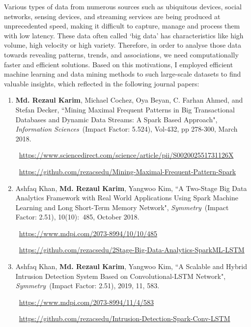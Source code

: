 \begin{appendices}
\hspace*{5mm} Various types of data from numerous sources such as ubiquitous devices, social networks, sensing devices, and streaming services are being produced at unprecedented speed, making it difficult to capture, manage and process them with low latency. These data often called `big data' has characteristics like high volume, high velocity or high variety. Therefore, in order to analyse those data towards revealing patterns, trends, and associations, we need computationally faster and efficient solutions. Based on this motivations, I employed efficient machine learning and data mining methods to such large-scale datasets to find valuable insights, which reflected in the following journal papers:

\begin{enumerate}[noitemsep]
	\item {\bf Md. Rezaul Karim}, Michael Cochez, Oya Beyan, C. Farhan Ahmed, and Stefan Decker, ``Mining Maximal Frequent Patterns in Big Transactional Databases and Dynamic Data Streams: A Spark Based Approach", \emph{Information Sciences}~(Impact Factor: 5.524), Vol-432, pp 278-300, March 2018.
	
	\faLink~\url{https://www.sciencedirect.com/science/article/pii/S002002551731126X}
	
	\faGithub~\url{https://github.com/rezacsedu/Mining-Maximal-Frequent-Pattern-Spark}
	
	\item Ashfaq Khan, \textbf{Md. Rezaul Karim}, Yangwoo Kim, ``A Two-Stage Big Data Analytics Framework with Real World Applications Using Spark Machine Learning and Long Short-Term Memory Network", \emph{Symmetry}~(Impact Factor: 2.51), 10(10):~485, October 2018. 
	
	\faLink~\url{https://www.mdpi.com/2073-8994/10/10/485}
	
	\faGithub~\url{https://github.com/rezacsedu/2Stage-Big-Data-Analytics-SparkML-LSTM}
	
	\item Ashfaq Khan, \textbf{Md. Rezaul Karim}, Yangwoo Kim, ``A Scalable and Hybrid Intrusion Detection System Based on  Convolutional-LSTM Network", \emph{Symmetry}~(Impact Factor: 2.51), 2019, 11, 583. 
	
	\faLink~\url{https://www.mdpi.com/2073-8994/11/4/583}
	
	\faGithub~\url{https://github.com/rezacsedu/Intrusion-Detection-Spark-Conv-LSTM}
\end{enumerate}


\end{appendices}
